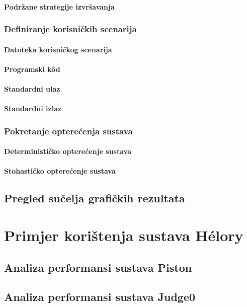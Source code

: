 \documentclass[times, utf8, diplomski]{fer}
\begin{document}
\subsubsection{Podržane strategije izvršavanja}
\subsection{Definiranje korisničkih scenarija}
\subsubsection{Datoteka korisničkog scenarija}
\subsubsection{Programski kôd}
\subsubsection{Standardni ulaz}
\subsubsection{Standardni izlaz}
\subsection{Pokretanje opterećenja sustava}
\subsubsection{Determinističko opterećenje sustava}
\subsubsection{Stohastičko opterećenje sustava}
\section{Pregled sučelja grafičkih rezultata}

\chapter{Primjer korištenja sustava Hélory}
\label{chap:use}
\section{Analiza performansi sustava Piston}
\section{Analiza performansi sustava Judge0}
\end{document}
